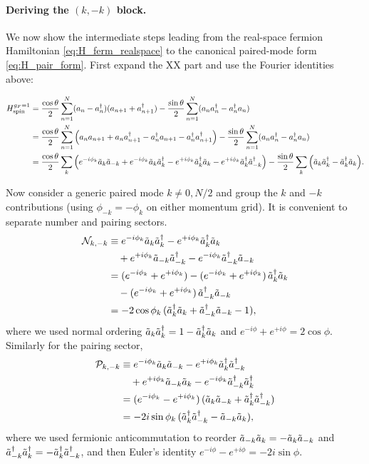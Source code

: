 \documentclass[aps,prx,twocolumn,superscriptaddress,nofootinbib,nolongbibliography,nobalancelastpage,10pt,floatfix]{revtex4-2}
\begin{document}
\paragraph{Deriving the $(k,-k)$ block.}
We now show the intermediate steps leading from the real-space fermion Hamiltonian \cref{eq:H_ferm_realspace}
to the canonical paired-mode form \cref{eq:H_pair_form}.
First expand the XX part and use the Fourier identities above:
\begin{widetext}
    \begin{align}
        H_{\mathrm{spin}}^{g_F=1}
        &= \frac{\cos\theta}{2}\sum_{n=1}^{N}(a_n-a_n^\dag)(a_{n+1}+a_{n+1}^\dag)
           -\frac{\sin\theta}{2}\sum_{n=1}^{N}(a_n a_n^\dag-a_n^\dag a_n)\nonumber\\
        &= \frac{\cos\theta}{2}\sum_{n=1}^{N}\Big(a_n a_{n+1} + a_n a_{n+1}^\dag - a_n^\dag a_{n+1} - a_n^\dag a_{n+1}^\dag\Big)
           -\frac{\sin\theta}{2}\sum_{n=1}^{N}(a_n a_n^\dag-a_n^\dag a_n)\nonumber\\
        &= \frac{\cos\theta}{2}\sum_{k}\Big(e^{-i\phi_k}\tilde{a}_k\tilde{a}_{-k}
           + e^{-i\phi_k}\tilde{a}_k\tilde{a}_k^\dag
           - e^{+i\phi_k}\tilde{a}_k^\dag\tilde{a}_k
           - e^{+i\phi_k}\tilde{a}_k^\dag\tilde{a}_{-k}^\dag\Big)
           -\frac{\sin\theta}{2}\sum_{k}\Big(\tilde{a}_k\tilde{a}_k^\dag-\tilde{a}_k^\dag\tilde{a}_k\Big).
        \label{eq:H_momentum_raw}
    \end{align}
\end{widetext}
Now consider a generic paired mode $k\neq 0,N/2$ and group the $k$ and $-k$ contributions (using $\phi_{-k}=-\phi_k$ on either momentum grid).
It is convenient to separate number and pairing sectors.
\begin{align}
    \mathcal{N}_{k,-k}
    &\equiv e^{-i\phi_k}\tilde{a}_k\tilde{a}_k^\dag - e^{+i\phi_k}\tilde{a}_k^\dag\tilde{a}_k
      \nonumber\\
    &\quad
      + e^{+i\phi_k}\tilde{a}_{-k}\tilde{a}_{-k}^\dag - e^{-i\phi_k}\tilde{a}_{-k}^\dag\tilde{a}_{-k}\nonumber\\
    &= (e^{-i\phi_k}+e^{+i\phi_k})
       - (e^{-i\phi_k}+e^{+i\phi_k})\,\tilde{a}_k^\dag\tilde{a}_k\nonumber\\
    &\quad
       - (e^{-i\phi_k}+e^{+i\phi_k})\,\tilde{a}_{-k}^\dag\tilde{a}_{-k}\nonumber\\
    &= -2\cos\phi_k\,(\tilde{a}_k^\dag\tilde{a}_k+\tilde{a}_{-k}^\dag\tilde{a}_{-k}-1),
\end{align}
where we used normal ordering $\tilde{a}_k\tilde{a}_k^\dag=1-\tilde{a}_k^\dag\tilde{a}_k$ and $e^{-i\phi}+e^{+i\phi}=2\cos\phi$.
Similarly for the pairing sector,
\begin{align}
    \mathcal{P}_{k,-k}
    &\equiv e^{-i\phi_k}\tilde{a}_k\tilde{a}_{-k} - e^{+i\phi_k}\tilde{a}_k^\dag\tilde{a}_{-k}^\dag
      \nonumber\\
    &\quad
      + e^{+i\phi_k}\tilde{a}_{-k}\tilde{a}_k - e^{-i\phi_k}\tilde{a}_{-k}^\dag\tilde{a}_k^\dag\nonumber\\
    &= (e^{-i\phi_k}-e^{+i\phi_k})\,(\tilde{a}_k\tilde{a}_{-k}+\tilde{a}_k^\dag\tilde{a}_{-k}^\dag)\nonumber\\
    &= -2i\sin\phi_k\,(\tilde{a}_k^\dag\tilde{a}_{-k}^\dag-\tilde{a}_{-k}\tilde{a}_k),
\end{align}
where we used fermionic anticommutation to reorder $\tilde{a}_{-k}\tilde{a}_k=-\tilde{a}_k\tilde{a}_{-k}$ and $\tilde{a}_{-k}^\dag\tilde{a}_k^\dag=-\tilde{a}_k^\dag\tilde{a}_{-k}^\dag$,
and then Euler's identity $e^{-i\phi}-e^{+i\phi}=-2i\sin\phi$.
\end{document}
